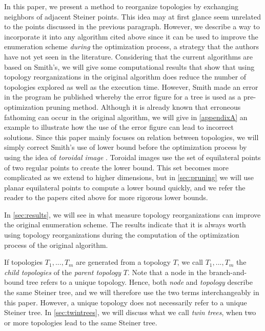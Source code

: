 \documentclass{article}
\theoremstyle{plain}
\begin{document}
In this paper, we present a method to reorganize topologies by exchanging neighbors of adjacent Steiner points. 
This idea may at first glance seem unrelated to the points discussed in the previous paragraph. 
However, we describe a way to incorporate it into any algorithm cited above since it can be used to improve the enumeration scheme \emph{during} the optimization process, a strategy that the authors have not yet seen in the literature. 
Considering that the current algorithms are based on Smith's, we will give some computational results that show that using topology reorganizations in the original algorithm does reduce the number of topologies explored as well as the execution time. 
However, Smith made an error in the program he published whereby the error figure for a tree is used as a pre-optimization pruning method. 
Although it is already known that erroneous fathoming can occur in the original algorithm, we will give in \cref{appendixA} an example to illustrate how the use of the error figure can lead to incorrect solutions. 
Since this paper mainly focuses on relation between topologies, we will simply correct Smith's use of lower bound before the optimization process by using the idea of \emph{toroidal image} \cite{ref2}. 
Toroidal images use the set of equilateral points of two regular points to create the lower bound. 
This set becomes more complicated as we extend to higher dimensions, but in \cref{sec:pruning} we will use planar equilateral points to compute a lower bound quickly, and we refer the reader to the papers cited above for more rigorous lower bounds. 


In \cref{sec:results}, we will see in what measure topology reorganizations can improve the original enumeration scheme. 
The results indicate that it is always worth using topology reorganizations during the computation of the optimization process of the original algorithm.

If topologies $T_1,...,T_m$ are generated from a topology $T$, we call $T_1,...,T_m$ the \emph{child topologies} of the \emph{parent topology} $T$. 
Note that a node in the \mbox{branch-and-bound} tree refers to a unique topology. 
Hence, both \emph{node} and \emph{topology} describe the same Steiner tree, and we will therefore use the two terms interchangeably in this paper. 
However, a unique topology does not necessarily refer to a unique Steiner tree. 
In \cref{sec:twintrees}, we will discuss what we call \emph{twin trees}, when two or more topologies lead to the same Steiner tree.
\end{document}
